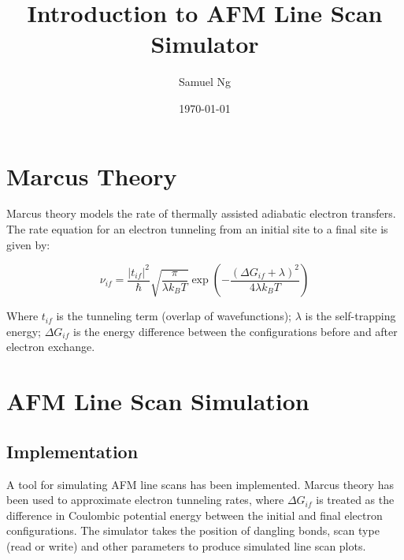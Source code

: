 \documentclass{article}
\title{Introduction to AFM Line Scan Simulator}
\date{\today}
\author{Samuel Ng}
\begin{document}
\makeatletter
\begin{center}
  \Large
  \textbf{\@title}
  \par
  \@author
\end{center}
\makeatother


\section{Marcus Theory} \label{sec:introduction}




Marcus theory models the rate of thermally assisted adiabatic electron transfers. The rate equation for an electron tunneling from an initial site to a final site is given by:

\begin{equation}
  \nu_{i f} = \frac{|t_{i f}|^{2}}{\hbar} \sqrt{\frac{\pi}{\lambda k_{B} T}} \exp \left(- \frac{(\Delta G_{i f} + \lambda)^{2}}{4 \lambda k_{B} T} \right)
  \label{eq:marcus-tunneling-rate}
\end{equation}

Where $t_{i f}$ is the tunneling term (overlap of wavefunctions); $\lambda$ is the self-trapping energy; $\Delta G_{i f}$ is the energy difference between the configurations before and after electron exchange. 




\section{AFM Line Scan Simulation} \label{sec:simulation}


\subsection{Implementation}

A tool for simulating AFM line scans has been implemented. Marcus theory has been used to approximate electron tunneling rates, where $\Delta G_{i f}$ is treated as the difference in Coulombic potential energy between the initial and final electron configurations. The simulator takes the position of dangling bonds, scan type (read or write) and other parameters to produce simulated line scan plots.
\end{document}
